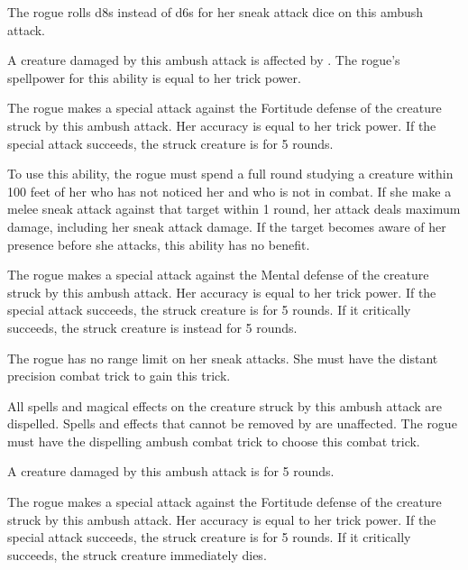     The rogue rolls d8s instead of d6s for her sneak attack dice on this ambush attack.

    A creature damaged by this ambush attack is affected by .
    The rogue's spellpower for this ability is equal to her trick power.

    The rogue makes a special attack against the Fortitude defense of the creature struck by this ambush attack.
    Her accuracy is equal to her trick power.
    If the special attack succeeds, the struck creature is \staggered for 5 rounds.

    To use this ability, the rogue must spend a full round studying a creature within 100 feet of her who has not noticed her and who is not in combat.
    If she make a melee sneak attack against that target within 1 round, her attack deals maximum damage, including her sneak attack damage.
    If the target becomes aware of her presence before she attacks, this ability has no benefit.

    The rogue makes a special attack against the Mental defense of the creature struck by this ambush attack.
    Her accuracy is equal to her trick power.
    If the special attack succeeds, the struck creature is \disoriented for 5 rounds.
    If it critically succeeds, the struck creature is instead \confused for 5 rounds.

    The rogue has no range limit on her sneak attacks.
    She must have the distant precision combat trick to gain this trick.

    All spells and magical effects on the creature struck by this ambush attack are dispelled.
    Spells and effects that cannot be removed by  are unaffected.
    The rogue must have the dispelling ambush combat trick to choose this combat trick.

    A creature damaged by this ambush attack is \dazed for 5 rounds.

    The rogue makes a special attack against the Fortitude defense of the creature struck by this ambush attack.
    Her accuracy is equal to her trick power.
    If the special attack succeeds, the struck creature is \staggered for 5 rounds.
    If it critically succeeds, the struck creature immediately dies.

